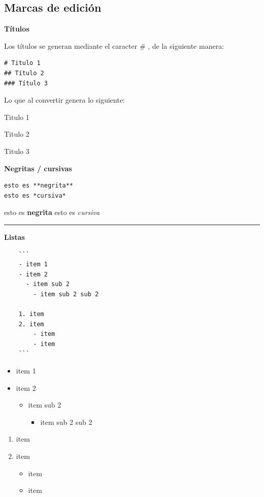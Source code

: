 \documentclass[
  11pt,
]{book}
\providecommand{\tightlist}{%
  \setlength{\itemsep}{0pt}\setlength{\parskip}{0pt}}
\begin{document}
\hypertarget{marcas-de-ediciuxf3n}{%
\subsection{Marcas de edición}\label{marcas-de-ediciuxf3n}}

\textbf{Títulos}

Los títulos se generan mediante el caracter \# , de la siguiente manera:

\begin{verbatim}
# Titulo 1
## Título 2
### Título 3
\end{verbatim}

Lo que al convertir genera lo siguiente:

Titulo 1

Titulo 2

Titulo 3

\textbf{Negritas / cursivas}

\begin{verbatim}
esto es **negrita**
esto es *cursiva*
\end{verbatim}

esto es \textbf{negrita}
esto es \emph{cursiva}

\begin{center}\rule{0.5\linewidth}{0.5pt}\end{center}

\textbf{Listas}

\begin{verbatim}
    ```
    - item 1
    - item 2
      - item sub 2
        - item sub 2 sub 2

    1. item
    2. item
        - item
        - item
    ```
\end{verbatim}

\begin{itemize}
\tightlist
\item
  item 1
\item
  item 2

  \begin{itemize}
  \tightlist
  \item
    item sub 2

    \begin{itemize}
    \tightlist
    \item
      item sub 2 sub 2
    \end{itemize}
  \end{itemize}
\end{itemize}

\begin{enumerate}
\def\labelenumi{\arabic{enumi}.}
\tightlist
\item
  item
\item
  item

  \begin{itemize}
  \tightlist
  \item
    item
  \item
    item
  \end{itemize}
\end{enumerate}
\end{document}
